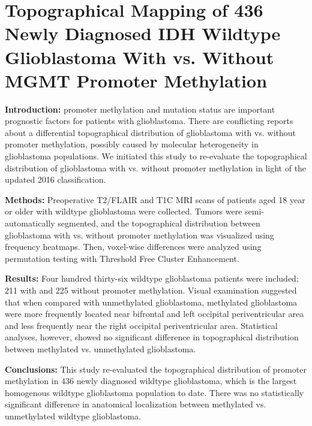 \chapter[Topographical Mapping of 436 Newly Diagnosed IDH Wildtype Glioblastoma With vs. Without MGMT Promoter Methylation][MGMT topographical mapping]{Topographical Mapping of 436 Newly Diagnosed IDH Wildtype Glioblastoma With vs. Without MGMT Promoter Methylation}\label{chap:HGGLocation}


\begin{ChapterAbstract}
    \textbf{Introduction:}  promoter methylation and  mutation status are important prognostic factors for patients with glioblastoma.
    There are conflicting reports about a differential topographical distribution of glioblastoma with vs. without  promoter methylation, possibly caused by molecular heterogeneity in glioblastoma populations.
    We initiated this study to re-evaluate the topographical distribution of glioblastoma with vs. without  promoter methylation in light of the updated  2016 classification.

    \textbf{Methods:} Preoperative \acrlong{T2}/\acrlong{FLAIR} and \acrlong{T1C} \acrlong{MRI} scans of patients aged 18 year or older with  wildtype glioblastoma were collected.
    Tumors were semi-automatically segmented, and the topographical distribution between glioblastoma with vs. without  promoter methylation was visualized using frequency heatmaps.
    Then, voxel-wise differences were analyzed using permutation testing with Threshold Free Cluster Enhancement.

    \textbf{Results:} Four hundred thirty-six  wildtype glioblastoma patients were included; 211 with and 225 without  promoter methylation.
    Visual examination suggested that when compared with  unmethylated glioblastoma,  methylated glioblastoma were more frequently located near bifrontal and left occipital periventricular area and less frequently near the right occipital periventricular area.
    Statistical analyses, however, showed no significant difference in topographical distribution between  methylated vs.  unmethylated glioblastoma.

    \textbf{Conclusions:} This study re-evaluated the topographical distribution of  promoter methylation in 436 newly diagnosed  wildtype glioblastoma, which is the largest homogenous  wildtype glioblastoma population to date.
    There was no statistically significant difference in anatomical localization between  methylated vs. unmethylated  wildtype glioblastoma.
\end{ChapterAbstract}

